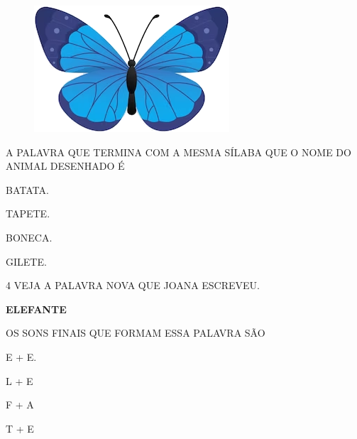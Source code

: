 \begin{figure}[H]
\centering
\includegraphics[width=\textwidth]{media/image227.png}
\end{figure}


A PALAVRA QUE TERMINA COM A MESMA SÍLABA QUE O NOME DO ANIMAL DESENHADO É

\begin{multicols}{2}
\begin{escolha}
\item BATATA.

\item TAPETE.

\item BONECA.

\item GILETE.
\end{escolha}
\end{multicols}

\num{4} VEJA A PALAVRA NOVA QUE JOANA ESCREVEU.

\begin{myquote}
\centering\LARGE\textbf{ELEFANTE}
\end{myquote}


OS SONS FINAIS QUE FORMAM ESSA PALAVRA SÃO

\begin{multicols}{2}
\begin{escolha}
\item E + E.

\item L + E

\item F + A

\item T + E
\end{escolha}
\end{multicols}

